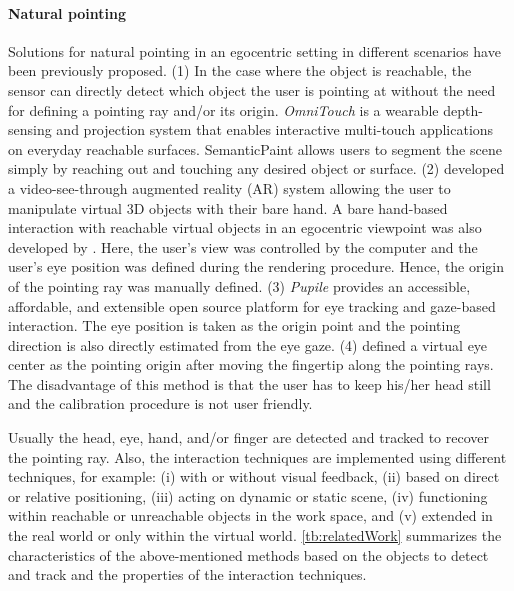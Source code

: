 \paragraph{Natural pointing} Solutions for natural pointing in an egocentric setting in different scenarios have been previously proposed. 
(1) In the case where the object is reachable, the sensor can directly detect which object the user is pointing at without the need for defining a pointing ray and/or its origin.  \textit{OmniTouch} \citep{Harrison2011} is a wearable depth-sensing and projection system that enables interactive multi-touch applications on everyday reachable surfaces.  
SemanticPaint \citep{export:244725} allows users to segment the scene simply by reaching out and touching any desired object or surface. 
(2) \citet{Ha2014} developed a video-see-through augmented reality (AR) system allowing the user to manipulate virtual 3D objects with their bare hand. A bare hand-based interaction with reachable virtual objects in an egocentric viewpoint was also developed by  \citet{Jang2015}.
Here, the user's view was controlled by the computer and the user's eye position was defined during the rendering procedure. Hence, the origin of the pointing ray was manually defined. 
(3) \textit{Pupile} \citep{Kassner2014} provides an accessible, affordable, and extensible open source platform for eye tracking and gaze-based interaction. The eye position is taken as the origin point and the pointing direction is also directly estimated from the eye gaze. 
(4) \citet{ma2015ismar} defined a virtual eye center as the pointing origin after moving the fingertip along the pointing rays. %
The disadvantage of this method is that the user has to keep his/her head still and the calibration procedure is not user friendly. 

Usually the head, eye, hand, and/or finger are detected and tracked to recover the pointing ray. Also, the interaction techniques are implemented using different techniques, for example: (i) with or without visual feedback, (ii) based on direct or relative positioning, (iii) acting on dynamic or static scene, (iv) {functioning} within reachable or unreachable objects in the work space, and (v) extended in the real world or only within the virtual world. 
\tablename{ \ref{tb:relatedWork}} summarizes the characteristics of the above-mentioned methods based on the objects to detect and track and the properties of the interaction techniques. 


